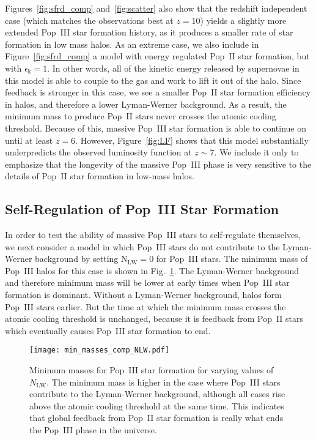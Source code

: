 \documentclass[a4paper,fleqn,usenatbib]{mnras}
\begin{document}
Figures~\ref{fig:sfrd_comp} and~\ref{fig:scatter} also show that the redshift independent case (which matches the observations best at $z=10$) yields a slightly more extended Pop~III star formation history, as it produces a smaller rate of star formation in low mass halos. As an extreme case, we also include in Figure~\ref{fig:sfrd_comp} a model with energy regulated Pop~II star formation, but with $\epsilon_\text{k} = 1$. In other words, all of the kinetic energy released by supernovae in this model is able to couple to the gas and work to lift it out of the halo.  Since feedback is stronger in this case, we see a smaller Pop~II star formation efficiency in halos, and therefore a lower Lyman-Werner background. As a result, the minimum mass to produce Pop~II stars never crosses the atomic cooling threshold. Because of this, massive Pop~III star formation is able to continue on until at least $z=6$. 
However, Figure~\ref{fig:LF} shows that this model substantially underpredicts the observed luminosity function at $z \sim 7$. We include it only to emphasize that the longevity of the massive Pop~III phase is very sensitive to the details of Pop~II star formation in low-mass halos.

\subsection{Self-Regulation of Pop~III Star Formation}
\label{sec:yields}

In order to test the 
ability of massive Pop~III stars to self-regulate themselves, we 
next consider a model in which Pop~III stars do not contribute to the Lyman-Werner background
by setting N$_\text{LW} = 0$ for Pop~III stars. The minimum mass of Pop~III halos for this case is shown in Fig.~\ref{fig:min_mass_comp2}. The Lyman-Werner background and therefore minimum mass will be lower at early times when Pop~III star formation is dominant. 
Without a Lyman-Werner background, halos form Pop~III stars earlier. But the time at which the minimum mass crosses the atomic cooling threshold is unchanged, because it is feedback from Pop~II stars which eventually causes 
Pop~III star formation to end.

\begin{figure}
	\texttt{[image: min\_masses\_comp\_NLW.pdf]}
    \caption{Minimum masses for Pop~III star formation for varying values of $N_\text{LW}$. The minimum mass is higher in the case where Pop~III stars contribute to the Lyman-Werner background, although all cases rise above the atomic cooling threshold at the same time. This indicates that global feedback from Pop~II star formation is really what ends the Pop~III phase in the universe.}
    \label{fig:min_mass_comp2}
\end{figure}
\end{document}
